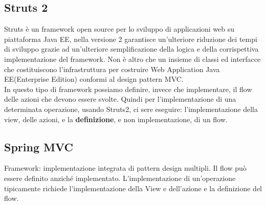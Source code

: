 \subsection{Struts 2}
Struts è un framework open source per lo sviluppo di applicazioni web su piattaforma Java EE, nella versione 2 garantisce un'ulteriore riduzione dei tempi di sviluppo grazie ad un'ulteriore semplificazione della logica e della corrispettiva implementazione del framework. Non è altro che un insieme di classi ed interfacce che costituiscono l'infrastruttura per costruire Web Application Java EE(Enterprise Edition) conformi al design pattern MVC.\\
In questo tipo di framework possiamo definire, invece che implementare, il flow delle azioni che devono essere svolte. Quindi per l'implementazione di una determinata operazione, usando Struts2, ci sere eseguire: l'implementazione della view, delle azioni, e la \textbf{definizione}, e non implementazione, di un flow.

\subsection{Spring MVC}
Framework: implementazione integrata di pattern design multipli.
Il flow può essere definito anziché implementato.
L’implementazione di un’operazione tipicamente richiede l’implementazione della View e dell’azione e la definizione del flow.